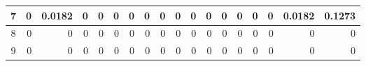 \begin{table}[ht]
\begin{adjustbox}{width = \textwidth, center}
\begin{tabular}{|c|r|r|r|r|r|r|r|r|r|r|r|r|r|r|r|r|r|}
            \cellcolor[HTML]{CFE2F3}7                            & 0                                              & \cellcolor[HTML]{C7E9D8}0.0182                 & 0                                              & 0                                              & 0                                              & 0                                              & 0                                              & 0                                               & 0                                               & 0                                               & 0                                               & 0                                               & 0                                               & 0                                               & 0                                               & \cellcolor[HTML]{D9D2E9}0.0182                                                        & \cellcolor[HTML]{D9D2E9}0.1273                                                            \\ \hline
            \rowcolor[HTML]{FFFFFF} 
            \cellcolor[HTML]{CFE2F3}8                            & 0                                              & 0                                              & 0                                              & 0                                              & 0                                              & 0                                              & 0                                              & 0                                               & 0                                               & 0                                               & 0                                               & 0                                               & 0                                               & 0                                               & 0                                               & \cellcolor[HTML]{D9D2E9}0                                                             & \cellcolor[HTML]{D9D2E9}0                                                                 \\ \hline
            \rowcolor[HTML]{FFFFFF} 
            \cellcolor[HTML]{CFE2F3}9                            & 0                                              & 0                                              & 0                                              & 0                                              & 0                                              & 0                                              & 0                                              & 0                                               & 0                                               & 0                                               & 0                                               & 0                                               & 0                                               & 0                                               & 0                                               & \cellcolor[HTML]{D9D2E9}0                                                             & \cellcolor[HTML]{D9D2E9}0                                                                 \\ \hline

\end{tabular}
\end{adjustbox}
\end{table}
